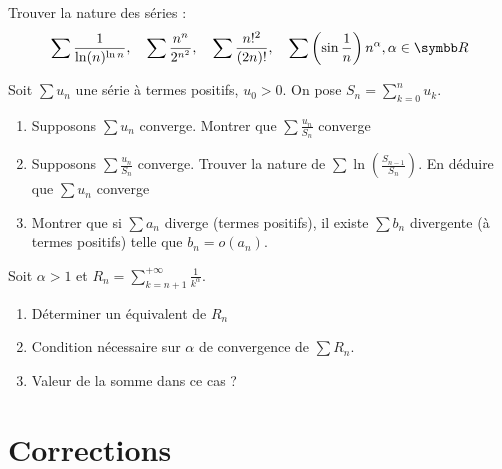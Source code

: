 \begin{exercice}
    Trouver la nature des séries :
    \[\sum \frac{1}{\ln(n)^{\ln n}}, \quad \sum \frac {n^n} {2^{n^2}}, \quad \sum \frac{n!^2}{(2n)!}, \quad \sum \left(\sin\frac{1}{n}\right) n^\alpha, \alpha \in \R\]
\end{exercice}

\begin{exercice}
    Soit $\sum u_{n}$ une série à termes positifs, $u_0 > 0$. On pose $\displaystyle S_{n}=\sum_{k=0}^{n}u_{k}$.
    \begin{enumerate}
        \item Supposons $\sum u_{n}$ converge. Montrer que $\sum\frac{u_{n}}{S_{n}}$ converge
        \item Supposons $\sum\frac{u_{n}}{S_{n}}$ converge. 
            Trouver la nature de $\sum \ln\left(\frac{S_{n-1}}{S_{n}}\right)$. 
            En déduire que $\sum u_{n}$ converge
        \item Montrer que si $\sum a_{n}$ diverge (termes positifs), 
            il existe $\sum b_{n}$ divergente (à termes positifs) telle que $b_{n}=o(a_{n})$.
    \end{enumerate}
\end{exercice}

\begin{exercice}
    Soit $\alpha>1$ et $\displaystyle R_{n}=\sum_{k=n+1}^{+\infty}\frac{1}{k^{\alpha}}$.
    \begin{enumerate}
        \item Déterminer un équivalent de $R_{n}$
        \item Condition nécessaire sur $\alpha$ de convergence de $\sum R_{n}$.
        \item Valeur de la somme dans ce cas ?
    \end{enumerate}
\end{exercice}

\newpage
\section{Corrections}

